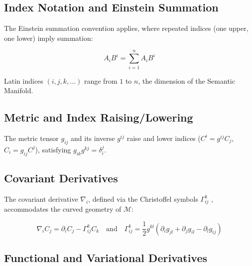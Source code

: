\subsection{Index Notation and Einstein Summation}
\label{sec:index_notation_and_einstein_summation}

The Einstein summation convention \autocite{Einstein1916} applies, where repeated indices (one upper, one lower) imply summation:

\begin{equation}
A_i B^i = \sum_{i=1}^n A_i B^i
\end{equation}

Latin indices \((i,j,k,...)\) range from \(1\) to \(n\), the dimension of the Semantic Manifold.


\subsection{Metric and Index Raising/Lowering}
\label{sec:metric_and_index_raising_lowering}

The metric tensor \(g_{ij}\) and its inverse \(g^{ij}\) raise and lower indices (\(C^i = g^{ij} C_j\), \(C_i = g_{ij} C^j\)), satisfying \(g_{ik} g^{kj} = \delta_i^j\).


\subsection{Covariant Derivatives}
\label{sec:covariant_derivatives}

The covariant derivative \(\nabla_i\), defined via the Christoffel symbols \(\Gamma^k_{ij}\) \autocite{Christoffel1869}, accommodates the curved geometry of \(\mathcal{M}\):

\begin{equation}
\nabla_i C_j = \partial_i C_j - \Gamma^k_{ij} C_k \quad \text{and} \quad \Gamma^k_{ij} = \frac{1}{2} g^{kl} ( \partial_i g_{jl} + \partial_j g_{il} - \partial_l g_{ij} )
\end{equation}


\subsection{Functional and Variational Derivatives}
\label{sec:functional_and_variational_derivatives}

